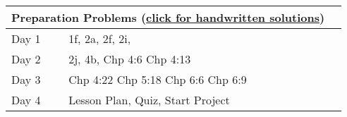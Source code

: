 \begin{center}
\begin{tabular}{ll|l}
\multicolumn{2}{c}{Preparation Problems (\href{http://ilearn.byui.edu/bbcswebdav/institution/Physical\_Sci\_Eng/Mathematics/Personal\%20Folders/WoodruffB/341/3-Patterns-Preparation-Solutions.pdf}{click for handwritten solutions})}
\\
\hline\hline
Day 1&
1f,
2a,
2f,
2i,
\\ \hline
Day 2&
2j,
4b,
Chp 4:6
Chp 4:13
\\ \hline
Day 3&
Chp 4:22
Chp 5:18
Chp 6:6
Chp 6:9
\\ \hline
Day 4&
Lesson Plan,
Quiz, Start Project 
&
\\ \hline
\end{tabular}
\end{center}






